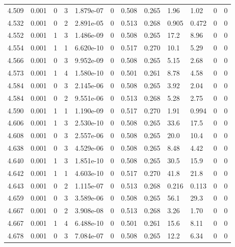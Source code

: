 \documentclass[preview]{standalone}
\begin{document}
{{{{{{{{{{{{\begin{tabular}{L{1.2cm}C{1.2cm} C{0.3cm}C{0.5cm} C{1.4cm}C{1.4cm} C{1.4cm}C{1.4cm} C{1.6cm}C{1.6cm} C{1.6cm}C{1.6cm}}
  4.509  &  0.001  & 0     &  3 &  1.879e-07  & 0  &  0.508&   0.265& 1.96 & 1.02   &  0 & 0  \\ 
  4.532  &  0.001  & 0     &  2 &  2.891e-05  & 0  &  0.513&   0.268& 0.905 & 0.472   &  0 & 0  \\ 
  4.552  &  0.001  & 1     &  3 &  1.486e-09  & 0  &  0.508&   0.265& 17.2 & 8.96   &  0 & 0  \\ 
  4.554  &  0.001  & 1     &  1 &  6.620e-10  & 0  &  0.517&   0.270& 10.1 & 5.29   &  0 & 0  \\ 
  4.566  &  0.001  & 0     &  3 &  9.952e-09  & 0  &  0.508&   0.265& 5.15 & 2.68   &  0 & 0  \\ 
  4.573  &  0.001  & 1     &  4 &  1.580e-10  & 0  &  0.501&   0.261& 8.78 & 4.58   &  0 & 0  \\ 
  4.584  &  0.001  & 0     &  3 &  2.145e-06  & 0  &  0.508&   0.265& 3.92 & 2.04   &  0 & 0  \\ 
  4.584  &  0.001  & 0     &  2 &  9.551e-06  & 0  &  0.513&   0.268& 5.28 & 2.75   &  0 & 0  \\ 
  4.590  &  0.001  & 1     &  1 &  1.190e-09  & 0  &  0.517&   0.270& 1.91 & 0.994   &  0 & 0  \\ 
  4.606  &  0.001  & 1     &  3 &  2.530e-10  & 0  &  0.508&   0.265& 33.6 & 17.5   &  0 & 0  \\ 
  4.608  &  0.001  & 0     &  3 &  2.557e-06  & 0  &  0.508&   0.265& 20.0 & 10.4   &  0 & 0  \\ 
  4.638  &  0.001  & 0     &  3 &  4.529e-06  & 0  &  0.508&   0.265& 8.48 & 4.42   &  0 & 0  \\ 
  4.640  &  0.001  & 1     &  3 &  1.851e-10  & 0  &  0.508&   0.265& 30.5 & 15.9   &  0 & 0  \\ 
  4.642  &  0.001  & 1     &  1 &  4.603e-10  & 0  &  0.517&   0.270& 41.8 & 21.8   &  0 & 0  \\ 
  4.643  &  0.001  & 0     &  2 &  1.115e-07  & 0  &  0.513&   0.268& 0.216 & 0.113   &  0 & 0  \\ 
  4.659  &  0.001  & 0     &  3 &  3.589e-06  & 0  &  0.508&   0.265& 56.1 & 29.3   &  0 & 0  \\ 
  4.667  &  0.001  & 0     &  2 &  3.908e-08  & 0  &  0.513&   0.268& 3.26 & 1.70   &  0 & 0  \\ 
  4.667  &  0.001  & 1     &  4 &  6.488e-10  & 0  &  0.501&   0.261& 15.6 & 8.11   &  0 & 0  \\ 
  4.678  &  0.001  & 0     &  3 &  7.084e-07  & 0  &  0.508&   0.265& 12.2 & 6.34   &  0 & 0  \\ 

\end{tabular}}}}}}}}}}}}}
\end{document}
